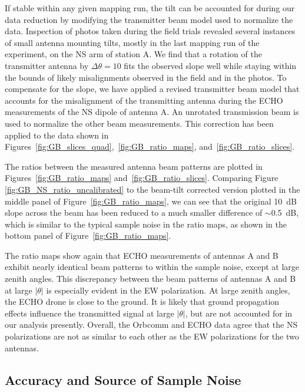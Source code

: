 \documentclass[preprint2,numberedappendix,tighten,twocolappendix]{aastex6}
\begin{document}
If stable within any given mapping run, the tilt can be accounted for during our data reduction by modifying the transmitter beam model used to normalize the data.  Inspection of photos taken during the field trials revealed several instances of small antenna mounting tilts, mostly in the last mapping run of the experiment, on the NS arm of station A.   We find that a rotation of the transmitter antenna by $\Delta \theta = 10$\arcdeg{} fits the observed slope well while staying within the bounds of likely misalignments observed in the field and in the photos.  To compensate for the slope, we have applied a revised transmitter beam model that accounts for the misalignment of the transmitting antenna during the ECHO measurements of the NS dipole of antenna A.  An unrotated transmission beam is used to normalize  the other beam measurements.  This correction has been applied to the data shown in Figures~\ref{fig:GB_slices_quad},~\ref{fig:GB_ratio_maps}, and~\ref{fig:GB_ratio_slices}.

The ratios between the measured antenna beam patterns are plotted in Figures~\ref{fig:GB_ratio_maps} and~\ref{fig:GB_ratio_slices}.   Comparing Figure \ref{fig:GB_NS_ratio_uncalibrated} to the beam-tilt corrected version plotted in the middle panel of Figure~\ref{fig:GB_ratio_maps}, we can see that the original 10~dB slope across the beam has been reduced to a much smaller difference of  $\sim$0.5~dB, which is similar to the typical sample noise in the ratio maps, as shown in the bottom panel of Figure~\ref{fig:GB_ratio_maps}.   

The ratio maps show again that ECHO measurements of antennas A and B exhibit nearly identical beam patterns to within the sample noise, except at large zenith angles.  This discrepancy between the beam patterns of antennas A and B at large $|\theta|$ is especially evident in the EW polarization. At large zenith angles, the ECHO drone is close to the ground.  It is likely that ground propagation effects influence the transmitted signal at large $|\theta|$, but are not accounted for in our analysis presently.    Overall, the Orbcomm and ECHO data agree that the NS polarizations are not as similar to each other as the EW polarizations for the two antennas.  



\subsection{Accuracy and Source of Sample Noise}
\end{document}
